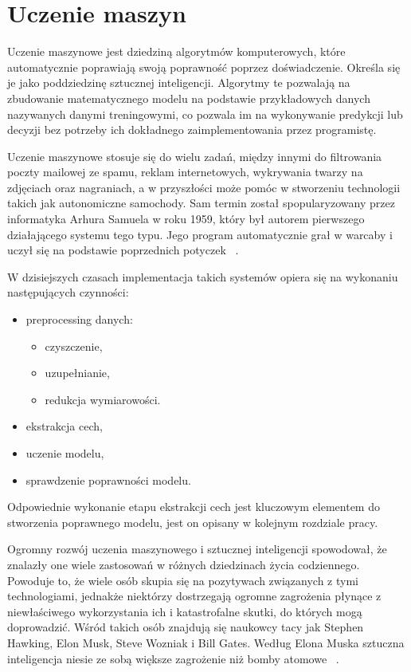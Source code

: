 \chapter{Uczenie maszyn}
Uczenie maszynowe jest dziedziną algorytmów komputerowych, które automatycznie poprawiają swoją poprawność poprzez doświadczenie. 
Określa się je jako poddziedzinę sztucznej inteligencji. Algorytmy te pozwalają na zbudowanie matematycznego modelu na podstawie 
przykładowych danych nazywanych danymi treningowymi, co pozwala im na wykonywanie predykcji lub decyzji bez potrzeby ich dokładnego 
zaimplementowania przez programistę. 


Uczenie maszynowe stosuje się do wielu zadań, między innymi do filtrowania poczty mailowej ze spamu, reklam internetowych, 
wykrywania twarzy na zdjęciach oraz nagraniach, a w przyszłości może pomóc w stworzeniu technologii takich jak 
autonomiczne samochody. Sam termin został spopularyzowany przez informatyka Arhura Samuela w roku 1959, który był autorem pierwszego działającego 
systemu tego typu. Jego program automatycznie grał w warcaby i uczył się na podstawie poprzednich potyczek ~\cite{MLBasics}. 


W dzisiejszych czasach implementacja takich systemów opiera się na wykonaniu następujących czynności:
\begin{itemize}
    \item preprocessing danych:
    \begin{itemize}
        \item czyszczenie,
        \item uzupełnianie,
        \item redukcja wymiarowości.
    \end{itemize}
    \item ekstrakcja cech,
    \item uczenie modelu,
    \item sprawdzenie poprawności modelu.
\end{itemize}
Odpowiednie wykonanie etapu ekstrakcji cech jest kluczowym elementem do stworzenia poprawnego modelu, jest
on opisany w kolejnym rozdziale pracy. 



Ogromny rozwój uczenia maszynowego i sztucznej inteligencji spowodował, że znalazły one 
wiele zastosowań w różnych dziedzinach życia codziennego. Powoduje to, że wiele osób skupia się 
na pozytywach związanych
z tymi technologiami, jednakże niektórzy dostrzegają ogromne zagrożenia płynące z niewłaściwego 
wykorzystania ich i katastrofalne skutki, do których mogą doprowadzić. 
Wśród takich osób znajdują się naukowcy tacy jak Stephen Hawking, Elon Musk, Steve Wozniak i Bill Gates. 
Według Elona Muska sztuczna inteligencja niesie ze sobą większe zagrożenie niż bomby atomowe ~\cite{dangers}. 

